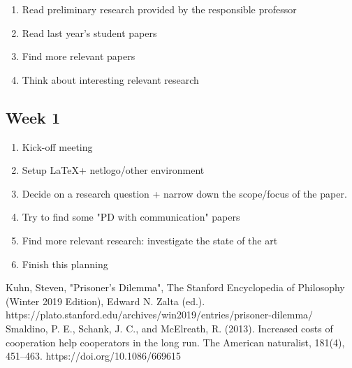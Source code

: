 \documentclass[english]{article}
\begin{document}
\begin{enumerate}
\item Read preliminary research provided by the responsible professor
\item Read last year's student papers
\item Find more relevant papers
\item Think about interesting relevant research
\end{enumerate}

\subsection*{Week 1}

\begin{enumerate}
\item Kick-off meeting
\item Setup \LaTeX + netlogo/other  environment
\item Decide on a research question + narrow down the scope/focus of the paper.
\item Try to find some "PD with communication" papers
\item Find more relevant research: investigate the state of the art
\item Finish this planning
\end{enumerate}



\begin{thebibliography}{9}
   Kuhn, Steven, "Prisoner’s Dilemma", The Stanford Encyclopedia of Philosophy (Winter 2019 Edition), Edward N. Zalta (ed.). https://plato.stanford.edu/archives/win2019/entries/prisoner-dilemma/
   Smaldino, P. E., Schank, J. C., and McElreath, R. (2013). Increased costs of cooperation help cooperators in the long run. The American naturalist, 181(4), 451–463. https://doi.org/10.1086/669615
\end{thebibliography}

\listoftodos
\end{document}
